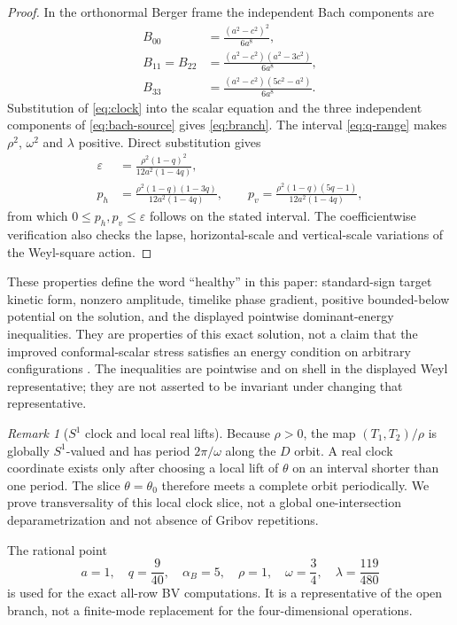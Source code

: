 \documentclass[11pt]{article}
\theoremstyle{definition}
\theoremstyle{remark}
\newtheorem{remark}[theorem]{Remark}
\begin{document}
\begin{proof}
In the orthonormal Berger frame the independent Bach components are
\begin{align}
 B_{00}&=\frac{(a^2-c^2)^2}{6a^8},\nonumber\\
 B_{11}=B_{22}&=\frac{(a^2-c^2)(a^2-3c^2)}{6a^8},\label{eq:bach-components}\\
 B_{33}&=\frac{(a^2-c^2)(5c^2-a^2)}{6a^8}.
\end{align}
Substitution of \eqref{eq:clock} into the scalar equation and the three
independent components of \eqref{eq:bach-source} gives
\eqref{eq:branch}.  The interval \eqref{eq:q-range} makes $\rho^2$,
$\omega^2$ and $\lambda$ positive.  Direct substitution gives
\begin{align}
 \varepsilon&=\frac{\rho^2(1-q)^2}{12a^2(1-4q)},\nonumber\\
 p_h&=\frac{\rho^2(1-q)(1-3q)}{12a^2(1-4q)},\qquad
 p_v=\frac{\rho^2(1-q)(5q-1)}{12a^2(1-4q)},
\end{align}
 from which $0\le p_h,p_v\le\varepsilon$ follows on the stated
interval.  The coefficientwise verification also checks the lapse,
horizontal-scale and vertical-scale variations of the Weyl-square action.
\end{proof}

These properties define the word ``healthy'' in this paper: standard-sign
target kinetic form, nonzero amplitude, timelike phase gradient, positive
bounded-below potential on the solution, and the displayed pointwise
dominant-energy inequalities.  They are properties of this exact solution,
not a claim that the improved conformal-scalar stress satisfies an energy
condition on arbitrary configurations \cite{CCJ}.  The inequalities are
pointwise and on shell in the displayed Weyl representative; they are not
asserted to be invariant under changing that representative.

\begin{remark}[$S^1$ clock and local real lifts]\label{rem:S1-clock}
Because $\rho>0$, the map $(T_1,T_2)/\rho$ is globally $S^1$-valued and has
period $2\pi/\omega$ along the $D$ orbit.  A real clock coordinate exists only
after choosing a local lift of $\theta$ on an interval shorter than one
period.  The slice $\theta=\theta_0$ therefore meets a complete orbit
periodically.  We prove transversality of this local clock slice, not a global
one-intersection deparametrization and not absence of Gribov repetitions.
\end{remark}

The rational point
\begin{equation}\label{eq:rational-fixture}
 a=1,\quad q=\frac9{40},\quad \alpha_B=5,\quad
 \rho=1,\quad \omega=\frac34,\quad \lambda=\frac{119}{480}
\end{equation}
is used for the exact all-row BV computations.  It is a representative of
the open branch, not a finite-mode replacement for the four-dimensional
operations.
\end{document}
